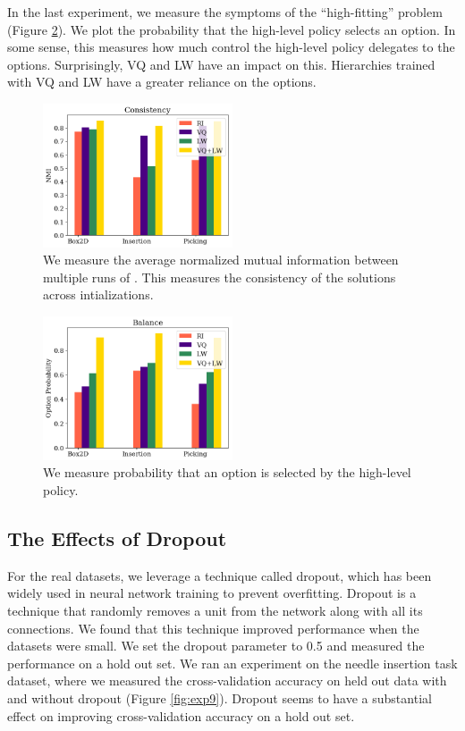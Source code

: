 In the last experiment, we measure the symptoms of the ``high-fitting'' problem (Figure \ref{fig:exp83}).
We plot the probability that the high-level policy selects an option.
In some sense, this measures how much control the high-level policy delegates to the options.
Surprisingly, VQ and LW have an impact on this.
Hierarchies trained with VQ and LW have a greater reliance on the options.

\begin{figure} [ht!]
\centering
    \includegraphics[width=0.5\textwidth]{ddco-experiments/exp8-2.png}
    \caption{We measure the average normalized mutual information between multiple runs of \alg. This measures the consistency of the solutions across intializations. \label{fig:exp82}}
\end{figure}


\begin{figure} [ht!]
\centering
    \includegraphics[width=0.5\textwidth]{ddco-experiments/exp8-3.png}
    \caption{We measure probability that an option is selected by the high-level policy. \label{fig:exp83}}
\end{figure}

\subsection*{The Effects of Dropout}
For the real datasets, we leverage a technique called dropout, which has been widely used in neural network training to prevent overfitting.
Dropout is a technique that randomly removes a unit from
the network along with all its connections.
We found that this technique improved performance when the datasets were small. We set the dropout parameter to 0.5 and measured the performance on a hold out set.
We ran an experiment on the needle insertion task dataset, where we measured the cross-validation accuracy on held out data with and without dropout (Figure \ref{fig:exp9}).
Dropout seems to have a substantial effect on improving cross-validation accuracy on a hold out set.

